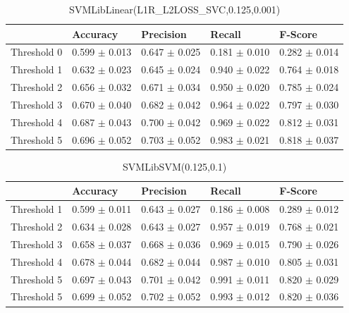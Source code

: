 \begin{table}[h]
	\centering
	\begin{tabular}{|l|l|l|l|l|} %
	\hline
	& Accuracy & Precision & Recall & F-Score \\ \hline
	Threshold 0 & 0.599	\( \pm \) 0.013	& 0.647	\( \pm \) 0.025	& 0.181	\( \pm \) 0.010	& 0.282	\( \pm \) 0.014	\\ \hline
	Threshold 1 & 0.632	\( \pm \) 0.023	& 0.645	\( \pm \) 0.024	& 0.940	\( \pm \) 0.022	& 0.764	\( \pm \) 0.018	\\ \hline
	Threshold 2 & 0.656	\( \pm \) 0.032	& 0.671	\( \pm \) 0.034	& 0.950	\( \pm \) 0.020	& 0.785	\( \pm \) 0.024	\\ \hline
	Threshold 3 & 0.670	\( \pm \) 0.040	& 0.682	\( \pm \) 0.042	& 0.964	\( \pm \) 0.022	& 0.797	\( \pm \) 0.030	\\ \hline
	Threshold 4 & 0.687	\( \pm \) 0.043	& 0.700	\( \pm \) 0.042	& 0.969	\( \pm \) 0.022	& 0.812	\( \pm \) 0.031	\\ \hline
	Threshold 5 & 0.696	\( \pm \) 0.052	& 0.703	\( \pm \) 0.052	& 0.983	\( \pm \) 0.021	& 0.818	\( \pm \) 0.037	\\ \hline
	\end{tabular}
	\caption{SVMLibLinear(L1R\_L2LOSS\_SVC,0.125,0.001)}
	\label{tab:revpol}
\end{table}
\begin{table}[h]
	\centering
	\begin{tabular}{|l|l|l|l|l|} %
	\hline
	& Accuracy & Precision & Recall & F-Score \\ \hline
	Threshold 1 & 0.599	\( \pm \) 0.011	& 0.643	\( \pm \) 0.027	& 0.186	\( \pm \) 0.008	& 0.289	\( \pm \) 0.012	\\ \hline
	Threshold 2 & 0.634	\( \pm \) 0.028	& 0.643	\( \pm \) 0.027	& 0.957	\( \pm \) 0.019	& 0.768	\( \pm \) 0.021	\\ \hline
	Threshold 3 & 0.658	\( \pm \) 0.037	& 0.668	\( \pm \) 0.036	& 0.969	\( \pm \) 0.015	& 0.790	\( \pm \) 0.026	\\ \hline
	Threshold 4 & 0.678	\( \pm \) 0.044	& 0.682	\( \pm \) 0.044	& 0.987	\( \pm \) 0.010	& 0.805	\( \pm \) 0.031	\\ \hline
	Threshold 5 & 0.697	\( \pm \) 0.043	& 0.701	\( \pm \) 0.042	& 0.991	\( \pm \) 0.011	& 0.820	\( \pm \) 0.029	\\ \hline
	Threshold 5 & 0.699	\( \pm \) 0.052	& 0.702	\( \pm \) 0.052	& 0.993	\( \pm \) 0.012	& 0.820	\( \pm \) 0.036	\\ \hline
	\end{tabular}
	\caption{SVMLibSVM(0.125,0.1)}
	\label{tab:revpol}
\end{table}
